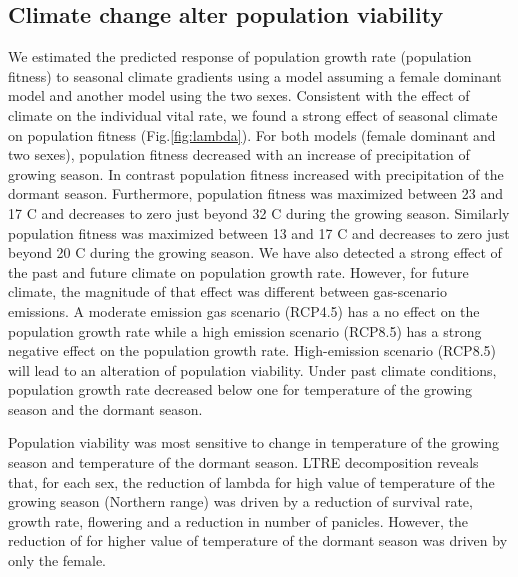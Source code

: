 \documentclass[12pt]{article}
\begin{document}
\subsection*{Climate change alter population viability}
We estimated the predicted response of  population growth rate (population fitness) to seasonal climate gradients using a model assuming a female dominant model and another model using the two sexes. 
Consistent with the effect of climate on the individual vital rate, we found a strong effect of seasonal climate on population fitness (Fig.\ref{fig:lambda}). 
For both models (female dominant and two sexes), population fitness decreased with an increase of precipitation of growing season. 
In contrast population fitness increased with precipitation of the dormant season.
Furthermore, population fitness was maximized between 23 and 17 \degree C and decreases to zero just beyond 32 \degree C during the growing season.
Similarly population fitness was maximized between 13 and 17 \degree C and decreases to zero just beyond 20 \degree C during the growing season.
We have also detected a strong effect of the past and future climate on population growth rate. However, for future climate, the magnitude of that effect was different between gas-scenario emissions. 
A moderate emission gas scenario (RCP4.5) has a no effect on the population growth rate while a high emission scenario (RCP8.5) has a strong negative effect on the population growth rate. 
High-emission scenario (RCP8.5) will lead to an alteration of population viability. 
Under past climate conditions, population growth rate decreased below one for temperature of the growing season and the dormant season.

Population viability was most sensitive to change in temperature of the growing season and temperature of the dormant season. 
LTRE decomposition reveals that, for each sex, the reduction of lambda for high value of temperature of the growing season (Northern range) was driven by a reduction of survival rate, growth rate, flowering and a reduction in number of panicles. 
However, the reduction of for higher value of temperature of the dormant season was driven by only the female. 
\end{document}
